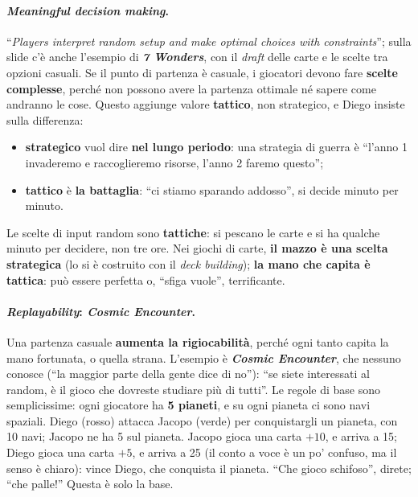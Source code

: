 \paragraph{\emph{Meaningful decision making}.} ``\emph{Players interpret random setup and make
optimal choices with constraints}''; sulla slide c'è anche l'esempio di \textbf{\emph{7
Wonders}}, con il \emph{draft} delle carte e le scelte tra opzioni casuali. Se il punto di
partenza è casuale, i giocatori devono fare \textbf{scelte complesse}, perché non possono
avere la partenza ottimale né sapere come andranno le cose. Questo aggiunge valore
\textbf{tattico}, non strategico, e Diego insiste sulla differenza:
\begin{itemize}
  \item \textbf{strategico} vuol dire \textbf{nel lungo periodo}: una strategia di guerra è
        ``l'anno 1 invaderemo e raccoglieremo risorse, l'anno 2 faremo questo'';
  \item \textbf{tattico} è \textbf{la battaglia}: ``ci stiamo sparando addosso'', si decide
        minuto per minuto.
\end{itemize}
Le scelte di input random sono \textbf{tattiche}: si pescano le carte e si ha qualche minuto
per decidere, non tre ore. Nei giochi di carte, \textbf{il mazzo è una scelta strategica}
(lo si è costruito con il \emph{deck building}); \textbf{la mano che capita è tattica}: può
essere perfetta o, ``sfiga vuole'', terrificante.

\paragraph{\emph{Replayability}: \emph{Cosmic Encounter}.} Una partenza casuale
\textbf{aumenta la rigiocabilità}, perché ogni tanto capita la mano fortunata, o quella
strana. L'esempio è \textbf{\emph{Cosmic Encounter}}, che nessuno conosce (``la maggior parte
della gente dice di no''): ``se siete interessati al random, è il gioco che dovreste studiare
più di tutti''. Le regole di base sono semplicissime: ogni giocatore ha \textbf{5 pianeti}, e
su ogni pianeta ci sono navi spaziali. Diego (rosso) attacca Jacopo (verde) per conquistargli
un pianeta, con 10 navi; Jacopo ne ha 5 sul pianeta. Jacopo gioca una carta $+10$, e arriva a
15; Diego gioca una carta $+5$, e arriva a 25 (il conto a voce è un po' confuso, ma il senso è
chiaro): vince Diego, che conquista il pianeta. ``Che gioco schifoso'', direte; ``che palle!''
Questa è solo la base.

